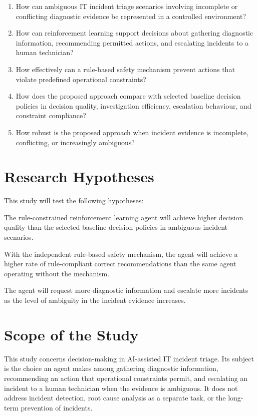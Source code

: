 \documentclass[12pt,a4paper]{article}
\begin{document}
\begin{enumerate}
  \item How can ambiguous IT incident triage scenarios involving incomplete or conflicting diagnostic evidence be represented in a controlled environment?
  \item How can reinforcement learning support decisions about gathering diagnostic information, recommending permitted actions, and escalating incidents to a human technician?
  \item How effectively can a rule-based safety mechanism prevent actions that violate predefined operational constraints?
  \item How does the proposed approach compare with selected baseline decision policies in decision quality, investigation efficiency, escalation behaviour, and constraint compliance?
  \item How robust is the proposed approach when incident evidence is incomplete, conflicting, or increasingly ambiguous?
\end{enumerate}

\section{Research Hypotheses}

This study will test the following hypotheses:

\begin{description}[leftmargin=3.2em,labelwidth=2.6em,labelsep=0.6em]
  \item[\textbf{H1:}] The rule-constrained reinforcement learning agent will achieve higher decision quality than the selected baseline decision policies in ambiguous incident scenarios.
  \item[\textbf{H2:}] With the independent rule-based safety mechanism, the agent will achieve a higher rate of rule-compliant correct recommendations than the same agent operating without the mechanism.
  \item[\textbf{H3:}] The agent will request more diagnostic information and escalate more incidents as the level of ambiguity in the incident evidence increases.
\end{description}

\section{Scope of the Study}

This study concerns decision-making in AI-assisted IT incident triage. Its subject is the choice an agent makes among gathering diagnostic information, recommending an action that operational constraints permit, and escalating an incident to a human technician when the evidence is ambiguous. It does not address incident detection, root cause analysis as a separate task, or the long-term prevention of incidents.
\end{document}
